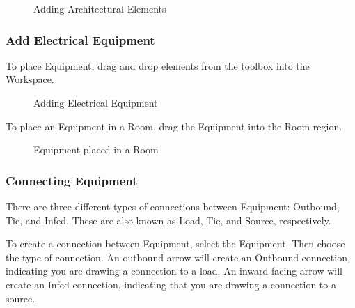 \documentclass[letterpaper,10pt,english]{sphinxmanual}
\begin{document}
\begin{figure}[H]
\centering
\capstart

\noindent{}
\caption{Adding Architectural Elements}\label{\detokenize{docs/userguide/buildingelectricalmodel/riser/index-riser:id17}}\end{figure}


\subsubsection{Add Electrical Equipment}
\label{\detokenize{docs/userguide/buildingelectricalmodel/riser/index-riser:add-electrical-equipment}}
To place Equipment, drag and drop elements from the toolbox into the Workspace.

\begin{figure}[H]
\centering
\capstart

\noindent{}
\caption{Adding Electrical Equipment}\label{\detokenize{docs/userguide/buildingelectricalmodel/riser/index-riser:id18}}\end{figure}

To place an Equipment in a Room, drag the Equipment into the Room region.

\begin{figure}[H]
\centering
\capstart

\noindent{}
\caption{Equipment placed in a Room}\label{\detokenize{docs/userguide/buildingelectricalmodel/riser/index-riser:id19}}\end{figure}


\subsubsection{Connecting Equipment}
\label{\detokenize{docs/userguide/buildingelectricalmodel/riser/index-riser:connecting-equipment}}
There are three different types of connections between Equipment: Outbound, Tie, and Infed.  These are also known as Load, Tie, and Source, respectively.

To create a connection between Equipment, select the Equipment.  Then choose the type of connection.  An outbound arrow will create an Outbound connection, indicating you are drawing a connection to a load.  An inward facing arrow will create an Infed connection, indicating that you are drawing a connection to a source.
\end{document}
